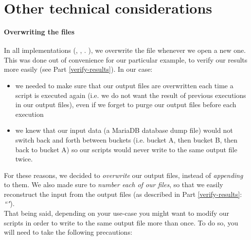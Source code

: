 
\renewcommand{\currentPart}{Other technical considerations}

\newpage
\part{Other technical considerations}

\subsection*{Overwriting the files}

In all implementations (\python, \awk, \perl. \julia), we overwrite the file whenever we open a new one. \\

This was done out of convenience for our particular example, to verify our results more easily (see Part \ref{verify-results}). In our case:
\begin{itemize}
	\item we needed to make sure that our output files are overwritten each time a script is executed again (i.e. we do not want the result of previous executions in our output files), even if we forget to purge our output files before each execution
	\item we knew that our input data (a MariaDB database dump file) would not switch back and forth between buckets (i.e. bucket A, then bucket B, then back to bucket A) so our scripts would never write to the same output file twice.
\end{itemize}

For these reasons, we decided to \emph{overwrite} our output files, instead of \emph{appending} to them. 
We also made sure to \emph{number each of our files}, so that we easily reconstruct the input from the output files (as described in Part \ref{verify-results}: \emph{``"}). \\



That being said, depending on your use-case you might want to modify our scripts in order to write to the same output file more than once. To do so, you will need to take the following precautions:

